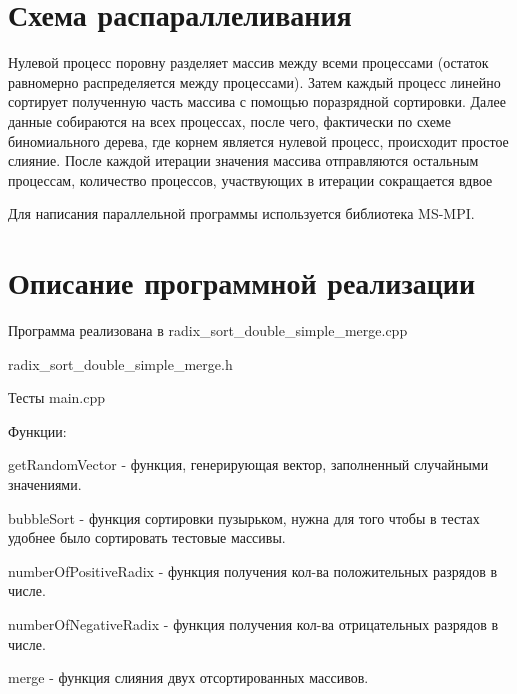 \documentclass{report}
\begin{document}
\section*{Схема распараллеливания}
Нулевой процесс поровну разделяет массив между всеми процессами (остаток
равномерно распределяется между процессами). Затем каждый процесс
линейно сортирует полученную часть массива с помощью поразрядной
сортировки. Далее данные собираются на всех процессах, после чего,
фактически по схеме биномиального дерева, где корнем является нулевой
процесс, происходит простое слияние. После каждой итерации значения
массива отправляются остальным процессам, количество процессов,
участвующих в итерации сокращается вдвое
\par

Для написания параллельной программы используется библиотека MS-MPI.
\newpage

\section*{Описание программной реализации}
Программа реализована в radix\_sort\_double\_simple\_merge.cpp
\par

radix\_sort\_double\_simple\_merge.h
\par

Тесты main.cpp
\par

Функции:\par

getRandomVector - функция,
генерирующая вектор, заполненный случайными значениями.
\par

bubbleSort - функция сортировки пузырьком, нужна для того чтобы в тестах
удобнее было сортировать тестовые массивы.
\par

numberOfPositiveRadix - функция получения кол-ва положительных разрядов
в числе.
\par

numberOfNegativeRadix - функция получения кол-ва отрицательных разрядов
в числе.
\par

merge - функция слияния двух отсортированных массивов.
\par
\end{document}

